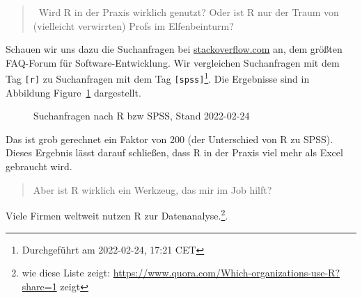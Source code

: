 \documentclass[
  letterpaper,
  DIV=11,
  numbers=noendperiod]{scrartcl}
\theoremstyle{definition}
\theoremstyle{definition}
\theoremstyle{definition}
\theoremstyle{remark}
\begin{document}
\begin{quote}
🧑‍🎓Wird R in der Praxis wirklich genutzt? Oder ist R nur der Traum von
(vielleicht verwirrten) Profs im Elfenbeinturm?
\end{quote}

Schauen wir uns dazu die Suchanfragen bei
\href{www.stackoverflow.com}{stackoverflow.com} an, dem größten
FAQ-Forum für Software-Entwicklung. Wir vergleichen Suchanfragen mit dem
Tag \texttt{{[}r{]}} zu Suchanfragen mit dem Tag
\texttt{{[}spss{]}}\footnote{Durchgeführt am 2022-02-24, 17:21 CET}. Die
Ergebnisse sind in Abbildung Figure~\ref{fig-stackoverflow1}
dargestellt.

\begin{figure}


\caption{\label{fig-stackoverflow1}Suchanfragen nach R bzw SPSS, Stand
2022-02-24}

\end{figure}%

Das ist grob gerechnet ein Faktor von 200 (der Unterschied von R zu
SPSS). Dieses Ergebnis lässt darauf schließen, dass R in der Praxis viel
mehr als Excel gebraucht wird.

\begin{quote}
Aber ist R wirklich ein Werkzeug, das mir im Job hilft?
\end{quote}

Viele Firmen weltweit nutzen R zur Datenanalyse.\footnote{wie diese
  Liste zeigt:
  \url{https://www.quora.com/Which-organizations-use-R?share=1} zeigt}.
\end{document}
